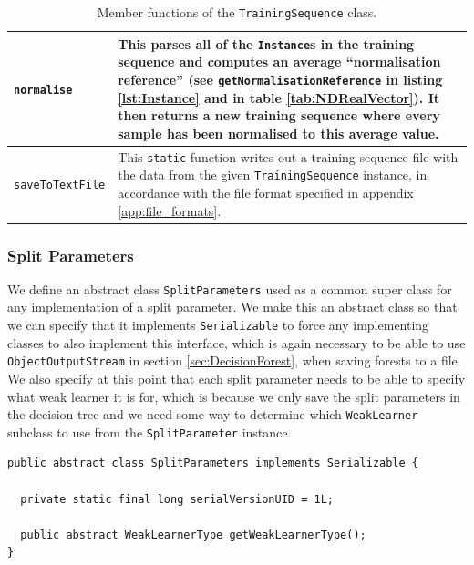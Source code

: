 \documentclass[12pt,twoside,notitlepage]{report}
\begin{document}
\begin{table}[H]
\begin{tabularx}{\textwidth}{p{4.5cm}|X}
                        \texttt{normalise} & 
                            This parses all of the \texttt{Instance}s in the training sequence and computes an average 
                            ``normalisation reference'' (see \texttt{getNormalisationReference} in listing 
                            \ref{lst:Instance} and in table \ref{tab:NDRealVector}). It then returns a new training 
                            sequence where every sample has been normalised to this average value. \\
                        \hline

                        \texttt{saveToTextFile} & 
                            This \texttt{static} function writes out a training sequence file with the data from the 
                            given \texttt{TrainingSequence} instance, in accordance with the file format specified in 
                            appendix \ref{app:file_formats}. \\

                    \end{tabularx}
                    \caption{Member functions of the \texttt{TrainingSequence} class.}
                    \label{tab:TrainingSequence}
                \end{table}





            \subsubsection{Split Parameters} \label{sec:split_params}
                We define an abstract class \texttt{SplitParameters} used as a common super class for any implementation 
                of a split parameter. We make this an abstract class so that we can specify that it implements 
                \texttt{Serializable} to force any implementing classes to also implement this interface, which is again 
                necessary to be able to use \texttt{ObjectOutputStream} in section \ref{sec:DecisionForest}, when saving 
                forests to a file. We also specify at this point that each split parameter needs to be 
                able to specify what weak learner it is for, which is because we only save the split parameters in the 
                decision tree and we need some way to determine which \texttt{WeakLearner} subclass to use from the 
                \texttt{SplitParameter} instance. 

                \begin{lstlisting}[caption={The \texttt{SplitParameters} abstract class declaration.}]
public abstract class SplitParameters implements Serializable {

  private static final long serialVersionUID = 1L;

  public abstract WeakLearnerType getWeakLearnerType();
}
                \end{lstlisting}
\end{document}
